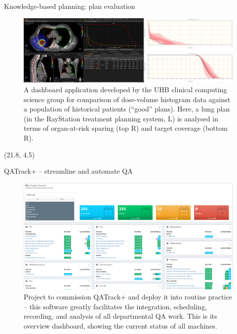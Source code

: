 \documentclass[final, unknownkeysallowed]{beamer}
\begin{document}
\begin{frame}{}
\begin{textblock}{19.5}
    \begin{block}{Knowledge-based planning: plan evaluation}
        \begin{figure}
          \includegraphics[width = \textwidth]{dvh_analysis.png}
          \caption*{A dashboard application developed by the UHB clinical computing science group for comparison of dose-volume histogram data against a population of historical patients (``good'' plans). Here, a lung plan (in the RayStation treatment planning system, L) is analysed in terms of organ-at-risk sparing (top R) and target coverage (bottom R).}\label{fig:kbp}
        \end{figure}
      \end{block}
\end{textblock}
%
\begin{textblock}{19.3}(21.8, 4.5)
    \begin{block}{QATrack+ -- streamline and automate QA}
        \begin{figure}
          \includegraphics[width = \textwidth]{qatrack_dashboard.png}
            \caption*{Project to commission QATrack+ and deploy it into routine practice -- this software greatly facilitates the integration, scheduling, recording, and analysis of all departmental QA work. This is its overview dashboard, showing the current status of all machines.}\label{fig:qatrack_dashboard}

\end{figure}
\end{block}
\end{textblock}
\end{frame}
\end{document}
